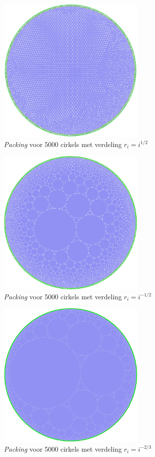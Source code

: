 \documentclass[12pt,a4paper,oneside]{book}
\begin{document}
\begin{figure}
  \centering
  \includegraphics[width=0.65\textwidth]{packing-1div2-5000.png}
  \caption{\textit{Packing} voor 5000 cirkels met verdeling $r_i=i^{1/2}$}
\end{figure}

\begin{figure}
  \centering
  \includegraphics[width=0.65\textwidth]{packing-neg1div2-5000.png}
  \caption{\textit{Packing} voor 5000 cirkels met verdeling $r_i=i^{-1/2}$}
\end{figure}

\begin{figure}
  \centering
  \includegraphics[width=0.65\textwidth]{packing-neg2div3-5000.png}
  \caption{\textit{Packing} voor 5000 cirkels met verdeling $r_i=i^{-2/3}$}
\end{figure}
\end{document}
